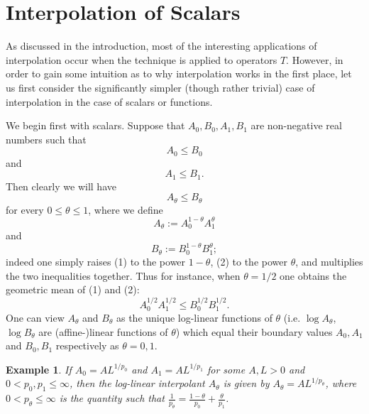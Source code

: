 \documentclass[10pt,reqno]{amsart}
\newtheorem{example}[theorem]{Example}
\begin{document}
\section{Interpolation of Scalars}

As discussed in the introduction, most of the interesting applications of interpolation occur when the technique is applied to operators $T$. However, in order to gain some intuition as to why interpolation works in the first place, let us first consider the significantly simpler (though rather trivial) case of interpolation in the case of scalars or functions.

We begin first with scalars. Suppose that $A_0, B_0, A_1, B_1$ are non-negative real numbers such that
%
\begin{equation} A_0 \leq B_0 \end{equation}
%
and
%
\begin{equation} A_1 \leq B_1. \end{equation}
%
Then clearly we will have
%
\begin{equation} A_\theta \leq B_\theta \end{equation}
%
for every $0 \leq \theta \leq 1$, where we define
%
\begin{equation} A_\theta := A_0^{1-\theta} A_1^\theta \end{equation}
%
and
%
\begin{equation} B_\theta := B_0^{1-\theta} B_1^\theta; \end{equation}
%
indeed one simply raises (1) to the power $1-\theta$, (2) to the power $\theta$, and multiplies the two inequalities together. Thus for instance, when $\theta = 1/2$ one obtains the geometric mean of (1) and (2):
%
\[ A_0^{1/2} A_1^{1/2} \leq B_0^{1/2} B_1^{1/2}.\]
%
One can view $A_\theta$ and $B_\theta$ as the unique log-linear functions of $\theta$ (i.e. $\log A_\theta$, $\log B_\theta$ are (affine-)linear functions of $\theta$) which equal their boundary values $A_0,A_1$ and $B_0,B_1$ respectively as $\theta = 0,1$.

\begin{example}
    If $A_0 = A L^{1/p_0}$ and $A_1 = A L^{1/p_1}$ for some $A,L>0$ and $0 < p_0,p_1 \leq \infty$, then the log-linear interpolant $A_\theta$ is given by $A_\theta = A L^{1/p_\theta}$, where $0 < p_\theta \leq \infty$ is the quantity such that $\frac{1}{p_\theta} = \frac{1-\theta}{p_0} + \frac{\theta}{p_1}$. 
\end{example}
\end{document}
